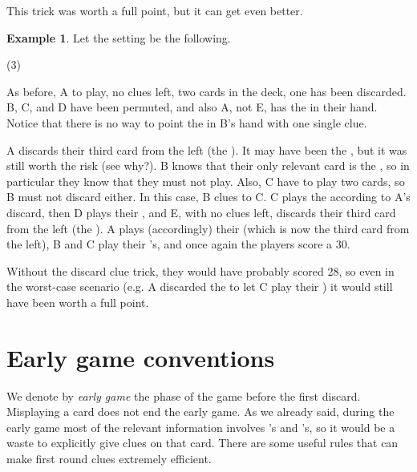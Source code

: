 \documentclass[a4paper]{article}
\theoremstyle{plain}
\theoremstyle{definition}
\newtheorem{example}[theorem]{Example}
\begin{document}
This trick was worth a full point, but it can get even better. 

\begin{example}
	
	Let the setting be the following.
	
	\begin{tasks}(3)
		\task[+]      
		\task[A]    
		\task[B]    
		\task[C]    
		\task[D]    
		\task[E]    
	\end{tasks}
	
	As before, A to play, no clues left, two cards in the deck, one  has been discarded. B, C, and D have been permuted, and also A, not E, has the  in their hand. Notice that there is no way to point the  in B's hand with one single clue.
	
	A discards their third card from the left (the ). It may have been the , but it was still worth the risk (see why?). B knows that their only relevant card is the , so in particular they know that they must not play. Also, C have to play two cards, so B must not discard either. In this case, B clues  to C. C plays the  according to A's discard, then D plays their , and E, with no clues left, discards their third card from the left (the ). A plays (accordingly) their  (which is now the third card from the left), B and C play their 's, and once again the players score a 30.
\end{example}

Without the discard clue trick, they would have probably scored 28, so even in the worst-case scenario (e.g. A discarded the  to let C play their ) it would still have been worth a full point.

\section{Early game conventions}
\label{earlgame}

We denote by \textit{early game} the phase of the game before the first discard. Misplaying a card does not end the early game. As we already said, during the early game most of the relevant information involves 's and 's, so it would be a waste to explicitly give clues on that card. There are some useful rules that can make first round clues extremely efficient.
\end{document}
